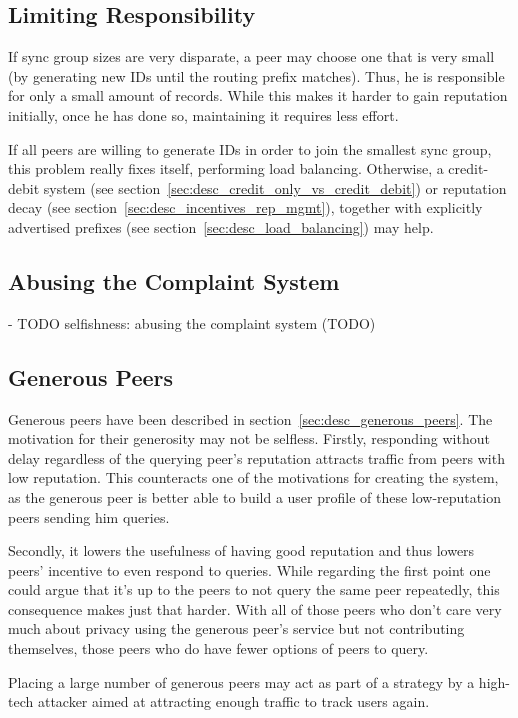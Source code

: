 \subsection{Limiting Responsibility}
If sync group sizes are very disparate, a peer may choose one that is very small
(by generating new IDs until the routing prefix matches). Thus, he is
responsible for only a small amount of records. While this makes it harder to
gain reputation initially, once he has done so, maintaining it requires less
effort.

If all peers are willing to generate IDs in order to join the smallest sync
group, this problem really fixes itself, performing load balancing. Otherwise, a
credit-debit system (see section~\ref{sec:desc_credit_only_vs_credit_debit}) or
reputation decay (see section~\ref{sec:desc_incentives_rep_mgmt}), together with
explicitly advertised prefixes (see section~\ref{sec:desc_load_balancing}) may
help.

\subsection{Abusing the Complaint System}
- TODO selfishness: abusing the complaint system (TODO)

\subsection{Generous Peers}
\label{sec:desc_attacks_generous}
Generous peers have been described in section~\ref{sec:desc_generous_peers}.
The motivation for their generosity may not be selfless. Firstly, responding
without delay regardless of the querying peer's reputation attracts traffic from
peers with low reputation. This counteracts one of the motivations for creating
the system, as the generous peer is better able to build a user profile of these
low-reputation peers sending him queries.

Secondly, it lowers the usefulness of having good reputation and thus lowers
peers' incentive to even respond to queries. While regarding the first point one
could argue that it's up to the peers to not query the same peer repeatedly,
this consequence makes just that harder. With all of those peers who don't care
very much about privacy using the generous peer's service but not contributing
themselves, those peers who do have fewer options of peers to query.

Placing a large number of generous peers may act as part of a strategy by a
high-tech attacker aimed at attracting enough traffic to track users again.

